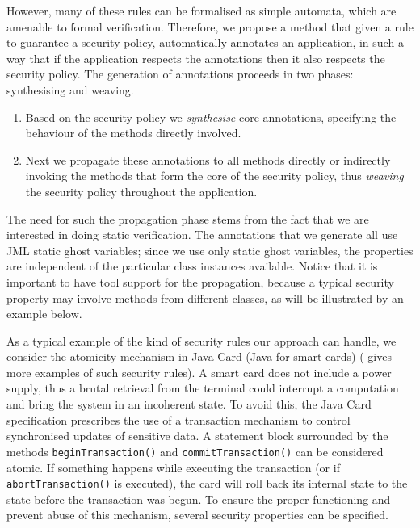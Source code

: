 However, many of these rules can be formalised as simple automata,
which are amenable to formal verification. Therefore, we propose a
method that given a rule to guarantee a security policy, automatically
annotates an application, in such a way that if the application
respects the annotations then it also respects the security
policy. The generation of annotations proceeds in two phases:
synthesising and weaving.
\begin{enumerate}
\item Based on the security policy we \emph{synthesise} core annotations, 
specifying the behaviour of the methods directly involved.
\item Next we propagate these annotations to all methods directly or
indirectly invoking the methods that form the core of the security
policy, thus \emph{weaving} the security policy throughout the
application.
\end{enumerate} 
The need for such the propagation phase stems from the fact that we
are interested in doing static verification. The annotations that we
generate all use JML static ghost variables; since we use only static
ghost variables, the properties are independent of the particular
class instances available. Notice that it is important to have tool
support for the propagation, because a typical security property may
involve methods from different classes, as will be illustrated by an
example below.

As a typical example of the kind of security rules our approach can
handle, we consider the atomicity mechanism in Java Card (Java for
smart cards) (\cite{PavlovaBBHL04cardis} gives more examples of such
security rules). A smart card does not include a power supply, thus a
brutal retrieval from the terminal could interrupt a computation and
bring the system in an incoherent state. To avoid this, the Java Card
specification prescribes the use of a transaction mechanism to control
synchronised updates of sensitive data. A statement block surrounded
by the methods \texttt{beginTransaction()} and
\texttt{commitTransaction()} can be considered atomic.
If something happens while executing the transaction (or if
\texttt{abortTransaction()} is executed), the card will
roll back its internal state to the state before the transaction was
begun. To ensure the proper functioning and prevent abuse of this
mechanism, several security properties can be specified.

